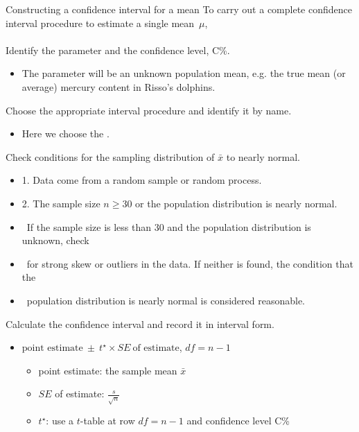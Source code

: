 \begin{onebox}{Constructing a confidence interval for a mean}
To carry out a complete confidence interval procedure to estimate a single \mbox{mean $\mu$,}
\\
\\
 Identify the parameter and the confidence level, C\%. \vspace{-1mm}
\begin{itemize} 
\item[] The parameter will be an unknown population mean, e.g. the true mean (or average) mercury content in Risso's dolphins.
\end{itemize}
 Choose the appropriate interval procedure and identify it by name.\vspace{-1mm}
\begin{itemize}
\item[] Here we choose the .
\end{itemize}
 Check conditions for the sampling distribution of $\bar{x}$ to nearly normal.\vspace{-1mm}
\begin{itemize}
\setlength{\itemsep}{0mm}
\item[] 1. Data come from a random sample or random process.
\item[] 2. The sample size $n\ge 30$ or the population distribution is nearly normal.
\item[] \quad \ If the sample size is less than 30 and the population distribution is unknown, check 
\item[] \quad \ for strong skew or outliers in the data.  If neither is found, the condition that the 
\item[] \quad \ population distribution is nearly normal is considered reasonable.  
\end{itemize}
 Calculate the confidence interval and record it in interval form. 
\begin{itemize}
\item[] $\text{point estimate}\ \pm\ t^{\star} \times SE\ \text{of estimate}$, \quad $df = n - 1$
\begin{itemize}
\item[] point estimate: the sample mean $\bar{x}$
\item[] $SE$ of estimate:  $\frac{s}{\sqrt{n}}$
\item[] $t^{\star}$: use a $t$-table at row $df = n-1$ and confidence level C\%

\end{itemize}
\end{itemize}
\end{onebox}
